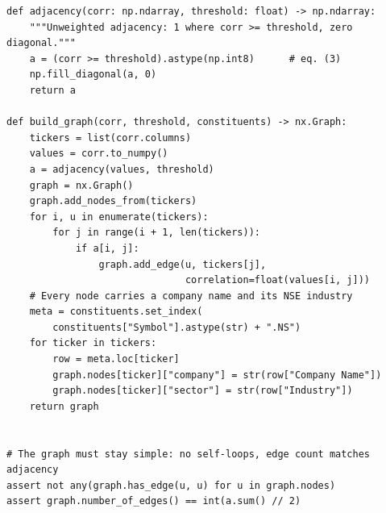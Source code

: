 \begin{lstlisting}[style=python]
def adjacency(corr: np.ndarray, threshold: float) -> np.ndarray:
    """Unweighted adjacency: 1 where corr >= threshold, zero diagonal."""
    a = (corr >= threshold).astype(np.int8)      # eq. (3)
    np.fill_diagonal(a, 0)
    return a

def build_graph(corr, threshold, constituents) -> nx.Graph:
    tickers = list(corr.columns)
    values = corr.to_numpy()
    a = adjacency(values, threshold)
    graph = nx.Graph()
    graph.add_nodes_from(tickers)
    for i, u in enumerate(tickers):
        for j in range(i + 1, len(tickers)):
            if a[i, j]:
                graph.add_edge(u, tickers[j],
                               correlation=float(values[i, j]))
    # Every node carries a company name and its NSE industry
    meta = constituents.set_index(
        constituents["Symbol"].astype(str) + ".NS")
    for ticker in tickers:
        row = meta.loc[ticker]
        graph.nodes[ticker]["company"] = str(row["Company Name"])
        graph.nodes[ticker]["sector"] = str(row["Industry"])
    return graph


# The graph must stay simple: no self-loops, edge count matches adjacency
assert not any(graph.has_edge(u, u) for u in graph.nodes)
assert graph.number_of_edges() == int(a.sum() // 2)
\end{lstlisting}
